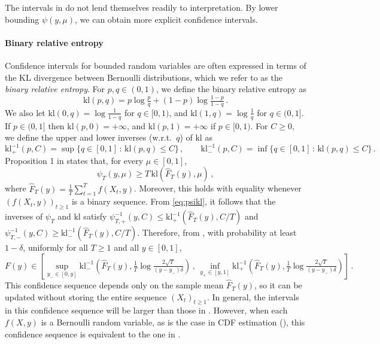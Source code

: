 \documentclass[3p, authoryear, 10pt]{elsarticle}%
\newcommand{\kl}{\mathrm{kl}}
\begin{document}
The intervals in  do not lend themselves readily to interpretation. By lower bounding $\psi(y, \mu)$, we can obtain more explicit confidence intervals.

\paragraph{Binary relative entropy} 

Confidence intervals for bounded random variables are often expressed in terms of the KL divergence between Bernoulli distributions, which we refer to as the \emph{binary relative entropy}. For $p, q \in (0, 1)$, we define the binary relative entropy as
\begin{equation*}
\kl(p,q) = p\log\tfrac pq + (1-p)\log\tfrac{1-p}{1-q}\,.
\end{equation*}
We also let $\kl(0,q) = \log\frac1{1-q}$ for $q\in[0,1)$, and $\kl(1,q) = \log\frac1q$ for $q\in(0,1]$. If $p\in(0,1]$ then $\kl(p,0) = +\infty$, and $\kl(p,1)=+\infty$ if $p\in[0,1)$. For $C \geq 0$, we define the upper and lower inverses (w.r.t.\ $q$) of $\kl$ as
\begin{equation*}
\kl^{-1}_+(p, C) = \sup\big\{q\in[0,1]\,:\,\kl(p,q)\leq C\big\}\,, \qquad \kl^{-1}_-(p, C) = \inf\big\{q\in[0,1]\,:\,\kl(p,q)\leq C\big\}\,.
\end{equation*}
Proposition 1 in \cite{orabona2023tight} states that, for every $\mu \in [0, 1]$, \begin{equation}\label{eq:psikl}\psi_T(y, \mu) \geq T\,\kl(\hat{F}_T(y), \mu)\,,\end{equation} where $\hat{F}_T(y) = \frac{1}{T}\sum_{t=1}^{T}f(X_t, y)$. Moreover, this holds with equality whenever $(f(X_t, y))_{t \geq 1}$ is a binary sequence. From \eqref{eq:psikl}, it follows that the inverses of $\psi_T$ and $\kl$ satisfy $\psi^{-1}_{T,+}(y,C) \leq \kl^{-1}_+(\hat{F}_T(y),C/T)$ and $\psi^{-1}_{T,-}(y,C) \geq \kl^{-1}_-(\hat{F}_T(y),C/T)$. Therefore, from , with probability at least $1 - \delta$, uniformly for all $T \geq 1$ and all $y \in [0, 1]$,
\begin{equation}
F(y) \in \left[\sup_{y_- \in [0, y]}\kl_-^{-1}\left(\hat{F}_T(y), \tfrac{1}{T}\log\tfrac{2\sqrt{T}}{(y-y_-)\delta}\right)\,,\, \inf_{y_+ \in [y, 1]}\kl_+^{-1}\left(\hat{F}_T(y), \tfrac{1}{T}\log\tfrac{2\sqrt{T}}{(y-y_-)\delta}\right)\right]\,.\label{eqn:klset}
\end{equation}
This confidence sequence depends only on the sample mean $\hat{F}_T(y)$, so it can be updated without storing the entire sequence $(X_t)_{t \geq 1}$. In general, the intervals in this confidence sequence will be larger than those in . However, when each $f(X, y)$ is a Bernoulli random variable, as is the case in CDF estimation (), this confidence sequence is equivalent to the one in .
\end{document}
